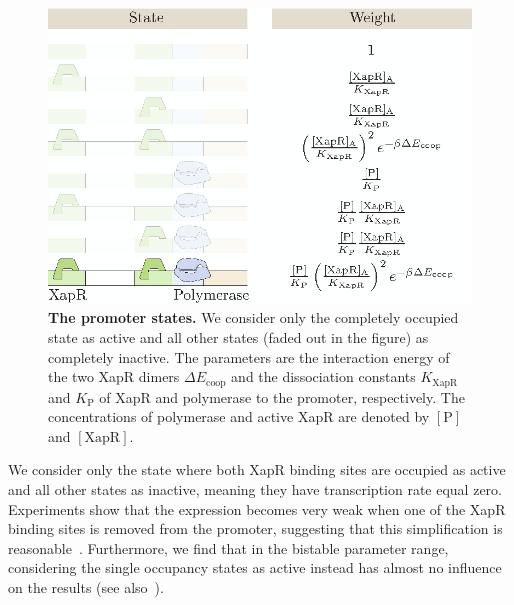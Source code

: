\documentclass[10pt,letterpaper]{article}
\newcommand{\n}[1]{\mathrm{#1}}
\begin{document}
\begin{figure}%
	\centering
	\includegraphics{media/States.eps}
	\caption{{\bf The promoter states.} We consider only the completely
	occupied state as active and all other states (faded out in the figure)
	as completely inactive. The parameters are the interaction energy of
	the two XapR dimers $\Delta E_{\n{coop}}$ and the dissociation
	constants $K_{\n{XapR}}$ and $K_{\n{P}}$ of XapR and polymerase
	to the promoter, respectively. The concentrations of polymerase
	and active XapR are denoted by $\n{[P]}$ and $\n{[XapR]}$.}
	\label{fig3:states}
\end{figure}

We consider only the state where both XapR binding sites are occupied as
active and all other states as inactive, meaning they have transcription
rate equal zero. Experiments show that the expression becomes very weak when one of
the XapR binding sites is removed from the promoter, suggesting that this
simplification is reasonable~\cite{Chure2019}. Furthermore, we find that in
the bistable parameter range, considering the single occupancy states as
active instead has almost no influence on the results (see
also~).
\end{document}
